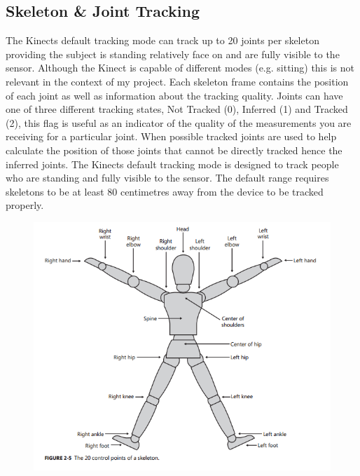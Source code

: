 \subsection{Skeleton \& Joint Tracking}
The Kinects default tracking mode can track up to 20 joints per skeleton providing the subject is standing relatively face on and are fully visible to the sensor. Although the Kinect is capable of different modes (e.g. sitting) this is not relevant in the context of my project.
Each skeleton frame contains the position of each joint as well as information about the tracking quality. Joints can have one of three different tracking states, Not Tracked (0), Inferred (1) and Tracked (2), this flag is useful as an indicator of the quality of the measurements you are receiving for a particular joint. When possible tracked joints are used to help calculate the position of those joints that cannot be directly tracked hence the inferred joints. The Kinects default tracking mode is designed to track people who are standing and fully visible to the sensor. The default range requires skeletons to be at least 80 centimetres away from the device to be tracked properly.

\begin{figure}[h]
    \centering
    \includegraphics[height=0.40\textheight]{fig02/kinSkel}
    \label{fig:kinskel}
\end{figure}



